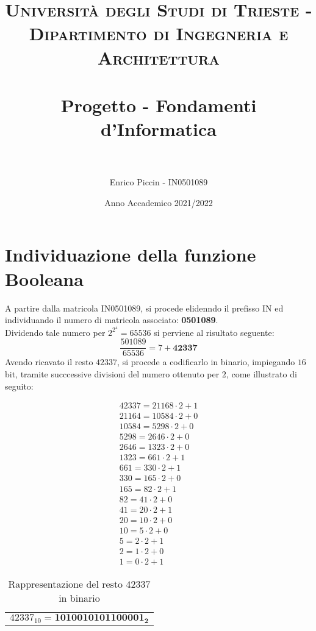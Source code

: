 \documentclass[a4paper]{extarticle}
\title{
\normalfont \normalsize
\textsc{Università degli Studi di Trieste - Dipartimento di Ingegneria e Architettura} \\[25pt]
\horrule{0.5pt} \\ [0.4cm] %
\huge Progetto - Fondamenti d'Informatica  \\ %
\horrule{2pt} \\ [0.4cm]%
}
\author{Enrico Piccin - IN0501089}
\date{Anno Accademico 2021/2022}
\begin{document}
\vspace{-10mm}
\maketitle

\tableofcontents
\newpage

\section{Individuazione della funzione Booleana}
A partire dalla matricola IN0501089, si procede elidenndo il prefisso IN ed individuando il numero di matricola associato: \textbf{0501089}.\\
Dividendo tale numero per \(2^{2^4} = 65536\) si perviene al risultato seguente:
\[\frac{501089}{65536} = 7 + \textbf{42337}\]
Avendo ricavato il resto $42337$, si procede a codificarlo in binario, impiegando $16$ bit, tramite succcessive divisioni del numero ottenuto per $2$, come illustrato di seguito:

\begin{table}[H]
  \centering
  \begin{align*}
    42337 = 21168 \cdot 2 + \boxed{1}\\
    21164 = 10584 \cdot 2 + \boxed{0}\\
    10584 = 5298  \cdot 2 + \boxed{0}\\
     5298 = 2646  \cdot 2 + \boxed{0}\\
     2646 = 1323  \cdot 2 + \boxed{0}\\
     1323 = 661   \cdot 2 + \boxed{1}\\
      661 = 330   \cdot 2 + \boxed{1}\\
      330 = 165   \cdot 2 + \boxed{0}\\
      165 = 82    \cdot 2 + \boxed{1}\\
       82 = 41    \cdot 2 + \boxed{0}\\
       41 = 20    \cdot 2 + \boxed{1}\\
       20 = 10    \cdot 2 + \boxed{0}\\
       10 = 5     \cdot 2 + \boxed{0}\\
        5 = 2     \cdot 2 + \boxed{1}\\
        2 = 1     \cdot 2 + \boxed{0}\\
        1 = 0     \cdot 2 + \boxed{1}
  \end{align*}
  \begin{tabular}{c}
    \[42337_{10} = \boldsymbol{1010010101100001_2}\]
  \end{tabular}
  \caption{Rappresentazione del resto $42337$ in binario}
  \label{tab:rappresentazione_resto_binario}
\end{table}
\end{document}
